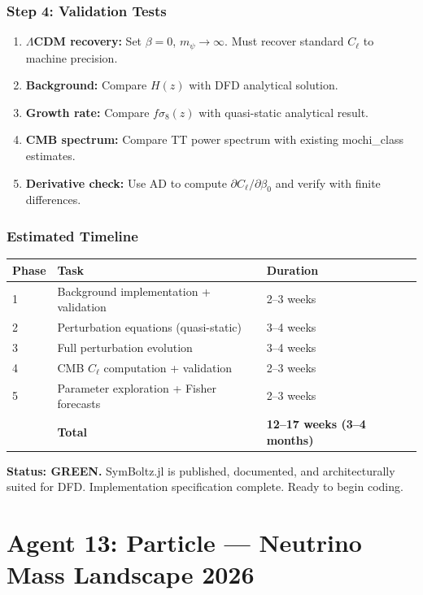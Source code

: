 \documentclass[11pt,a4paper]{article}
\newcommand{\GREEN}{\textcolor{dfdgreen}{\textbf{GREEN}}}
\begin{document}
\subsubsection{Step 4: Validation Tests}

\begin{enumerate}
\item \textbf{$\Lambda$CDM recovery:} Set $\beta = 0$, $m_\psi \to \infty$. Must recover standard $C_\ell$ to machine precision.
\item \textbf{Background:} Compare $H(z)$ with DFD analytical solution.
\item \textbf{Growth rate:} Compare $f\sigma_8(z)$ with quasi-static analytical result.
\item \textbf{CMB spectrum:} Compare TT power spectrum with existing mochi\_class estimates.
\item \textbf{Derivative check:} Use AD to compute $\partial C_\ell / \partial \beta_0$ and verify with finite differences.
\end{enumerate}

\subsubsection{Estimated Timeline}

\begin{center}
\begin{tabular}{lll}
\toprule
\textbf{Phase} & \textbf{Task} & \textbf{Duration} \\
\midrule
1 & Background implementation + validation & 2--3 weeks \\
2 & Perturbation equations (quasi-static) & 3--4 weeks \\
3 & Full perturbation evolution & 3--4 weeks \\
4 & CMB $C_\ell$ computation + validation & 2--3 weeks \\
5 & Parameter exploration + Fisher forecasts & 2--3 weeks \\
\midrule
& \textbf{Total} & \textbf{12--17 weeks (3--4 months)} \\
\bottomrule
\end{tabular}
\end{center}

\textbf{Status: \GREEN.} SymBoltz.jl is published, documented, and architecturally suited for DFD. Implementation specification complete. Ready to begin coding.

\section{Agent 13: Particle --- Neutrino Mass Landscape 2026}
\end{document}
